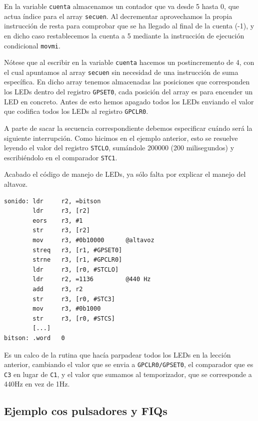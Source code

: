 En la variable {\tt cuenta} almacenamos un contador que va desde 5 hasta 0, que actua
índice para el array {\tt secuen}. Al decrementar aprovechamos la propia instrucción de
resta para comprobar que se ha llegado al final de la cuenta (-1), y en dicho caso
restablecemos la cuenta a 5 mediante la instrucción de ejecución condicional {\tt movmi}.

Nótese que al escribir en la variable {\tt cuenta} hacemos un postincremento de 4, con el
cual apuntamos al array {\tt secuen} sin necesidad de una instrucción de suma específica.
En dicho array tenemos almacenadas las posiciones que corresponden los LEDs dentro del
registro {\tt GPSET0}, cada posición del array es para encender un LED en concreto. Antes
de esto hemos apagado todos los LEDs enviando el valor que codifica todos los LEDs al
registro {\tt GPCLR0}.

A parte de sacar la secuencia correspondiente debemos especificar cuándo será la siguiente
interrupción. Como hicimos en el ejemplo anterior, esto se resuelve leyendo el valor del
registro {\tt STCLO}, sumándole 200000 (200 milisegundos) y escribiéndolo en el comparador
{\tt STC1}.

Acabado el código de manejo de LEDs, ya sólo falta por explicar el manejo del altavoz.

\begin{lstlisting}
sonido: ldr     r2, =bitson
        ldr     r3, [r2]
        eors    r3, #1
        str     r3, [r2]
        mov     r3, #0b10000      @altavoz
        streq   r3, [r1, #GPSET0]
        strne   r3, [r1, #GPCLR0]
        ldr     r3, [r0, #STCLO]
        ldr     r2, =1136         @440 Hz
        add     r3, r2
        str     r3, [r0, #STC3]
        mov     r3, #0b1000
        str     r3, [r0, #STCS]
        [...]
bitson: .word   0
\end{lstlisting}

Es un calco de la rutina que hacía parpadear todos los LEDs en la lección anterior, cambiando
el valor que se envia a {\tt GPCLR0/GPSET0}, el comparador que es {\tt C3} en lugar de {\tt C1},
y el valor que sumamos al temporizador, que se corresponde a 440Hz en vez de 1Hz.

\subsection{Ejemplo cos pulsadores y FIQs}


\chapterend{}

